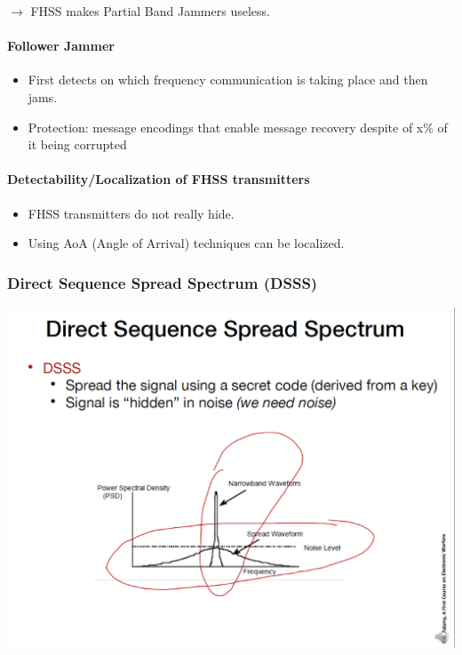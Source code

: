 $\rightarrow$ FHSS makes Partial Band Jammers useless.

\paragraph{Follower Jammer}
\begin{itemize}
    \item First detects on which frequency communication is taking
    place and then jams.
    \item Protection: message encodings that enable message
    recovery despite of x\% of it being corrupted
\end{itemize}

\paragraph{Detectability/Localization of FHSS transmitters}
\begin{itemize}
    \item FHSS transmitters do not really hide.
    \item Using AoA (Angle of Arrival) techniques can be localized.
\end{itemize}

\subsubsection{Direct Sequence Spread Spectrum (DSSS)}

\begin{minipage}{\linewidth}
    \centering      
    \includegraphics[width=\linewidth]{Figures/L2_DSSS.PNG} 
\end{minipage}

